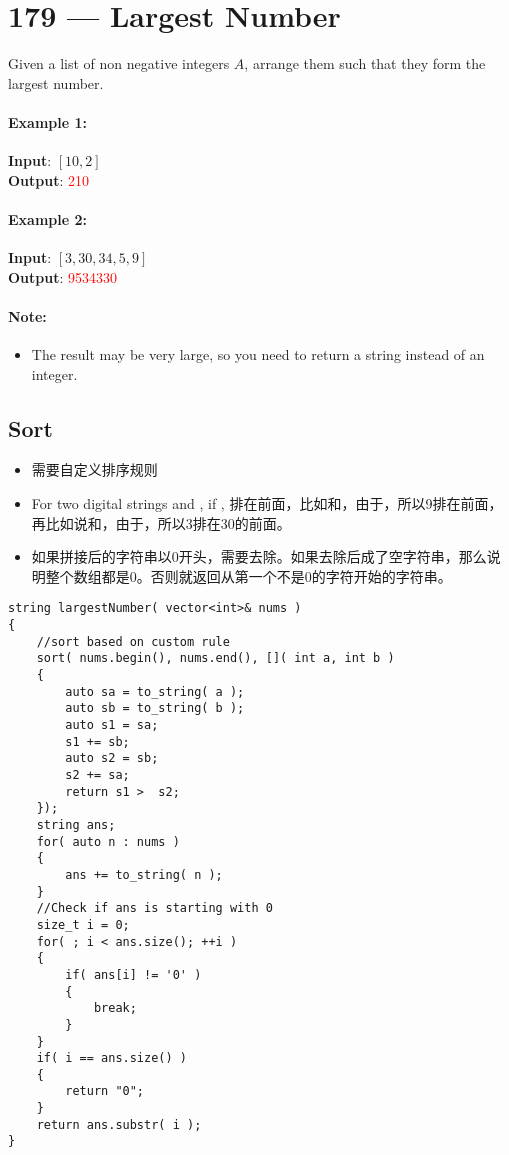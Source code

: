\section{179 --- Largest Number}
Given a list of non negative integers $A$, arrange them such that they form the largest number.
\paragraph{Example 1:}
\begin{flushleft}
\textbf{Input}: $[10,2]$
\\
\textbf{Output}: \textcolor{red}{210}
\end{flushleft}
\paragraph{Example 2:}
\begin{flushleft}
\textbf{Input}: $[3,30,34,5,9]$
\\
\textbf{Output}: \textcolor{red}{9534330}
\end{flushleft}
\paragraph{Note:} 
\begin{itemize}
\item The result may be very large, so you need to return a string instead of an integer.
\end{itemize}
\subsection{Sort}
\begin{itemize}
\item 需要自定义排序规则
\item For two digital strings  and , if , 排在前面，比如和，由于，所以9排在前面，再比如说和，由于，所以3排在30的前面。
\item 如果拼接后的字符串以0开头，需要去除。如果去除后成了空字符串，那么说明整个数组都是0。否则就返回从第一个不是0的字符开始的字符串。 
\end{itemize}
\setcounter{lstlisting}{0}
\begin{lstlisting}[style=customc, caption={Sort Based On Custom Rule}]
string largestNumber( vector<int>& nums )
{
	//sort based on custom rule
    sort( nums.begin(), nums.end(), []( int a, int b )
    {
        auto sa = to_string( a );
        auto sb = to_string( b );
        auto s1 = sa;
        s1 += sb;
        auto s2 = sb;
        s2 += sa;
        return s1 >  s2;
    });
    string ans;
    for( auto n : nums )
    {
        ans += to_string( n );
    }
	//Check if ans is starting with 0
    size_t i = 0;
    for( ; i < ans.size(); ++i )
    {
        if( ans[i] != '0' )
        {
            break;
        }
    }
    if( i == ans.size() )
    {
        return "0";
    }
    return ans.substr( i );
}
\end{lstlisting}